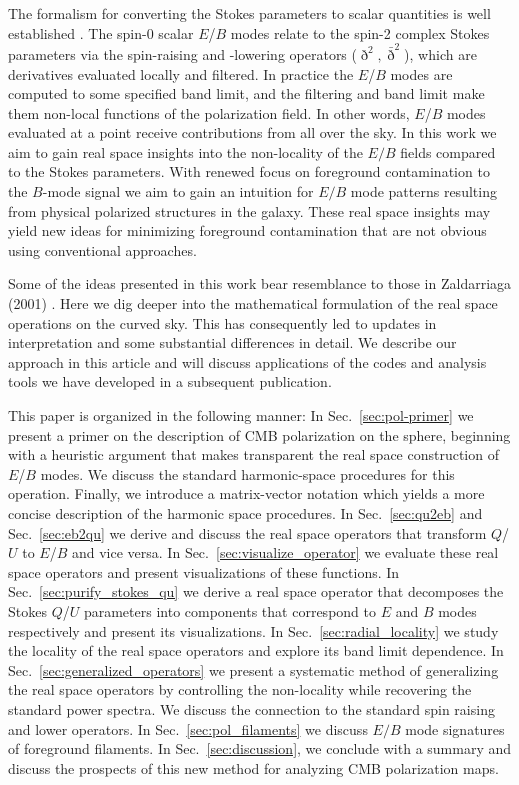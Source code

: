 \documentclass[a4paper,11pt]{article}
\def\sec#1{{Sec.~\ref{#1}}}
\begin{document}
The formalism for converting the Stokes parameters to scalar quantities is well established \citep{1997PhRvD..55.7368K,1997PhRvD..55.1830Z}. The spin-0 scalar $E$/$B$ modes relate to the spin-2 complex Stokes parameters via the spin-raising and -lowering operators ($\eth^2,\bar \eth^2$), which are derivatives evaluated locally and filtered.  In practice the $E$/$B$ modes are computed to some specified band limit, and the filtering and band limit make them non-local functions of the polarization field.  In other words, $E$/$B$ modes evaluated at a point receive contributions from all over the sky. In this work we aim to gain real space insights into the non-locality of the $E/B$ fields compared to the Stokes parameters. With renewed focus on foreground contamination to the $B$-mode signal we aim to gain an intuition for $E/B$ mode patterns resulting from physical polarized structures in the galaxy. These real space insights may yield new ideas for minimizing foreground contamination that are not obvious using conventional approaches. 

{Some of the ideas presented in this work bear resemblance to those in Zaldarriaga (2001) \citep{Zaldarriaga2001a}.  Here we dig deeper into the mathematical formulation of the real space operations on the curved sky.  This has consequently led to updates in interpretation and some substantial differences in detail.  We describe our approach in this article and will discuss applications of the codes and analysis tools we have developed in a subsequent publication.}
 
This paper is organized in the following manner: In \sec{sec:pol-primer} we present a primer on the description of CMB polarization on the sphere, beginning with a heuristic argument that makes transparent the real space construction of $E$/$B$ modes.  We discuss the standard harmonic-space procedures for this operation. Finally, we introduce a matrix-vector notation which yields a more concise description of the harmonic space procedures. In \sec{sec:qu2eb} and \sec{sec:eb2qu} we derive and discuss the real space operators that transform $Q$/$U$ to $E$/$B$ and vice versa. In \sec{sec:visualize_operator} we evaluate these real space operators and present visualizations of these functions. In \sec{sec:purify_stokes_qu} we derive a real space operator that decomposes the Stokes $Q$/$U$  parameters into components that correspond to $E$ and $B$ modes respectively and present its visualizations.  In \sec{sec:radial_locality} we study the locality of the real space operators and explore its band limit dependence. In \sec{sec:generalized_operators} we present a systematic method of generalizing the real space operators by controlling the non-locality while recovering the standard power spectra.  We discuss the connection to the standard spin raising and lower operators. In \sec{sec:pol_filaments} we discuss $E/B$ mode signatures of foreground filaments. In \sec{sec:discussion}, we conclude with a summary and discuss the prospects of this new method for analyzing CMB polarization maps.
\end{document}
